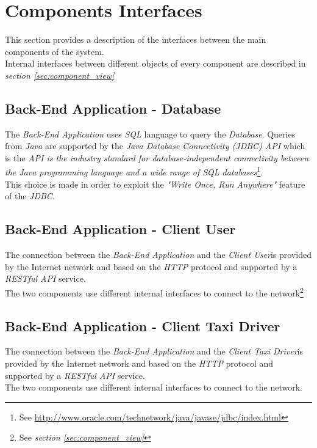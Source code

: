 \section{Components Interfaces} %
\label{sec:components_interfaces}
This section provides a description of the interfaces between the main components of the system.\\
Internal interfaces between different objects of every component are described in \emph{section \ref{sec:component_view}}
\subsection{Back-End Application - Database} %
\label{sub:back_end_application_database}
The \emph{Back-End Application} uses \emph{SQL} language to query the \emph{Database}. Queries from \emph{Java} are supported by the \emph{Java Database Connectivity (JDBC) API} which is the \emph{API is the industry standard for database-independent connectivity between the Java programming language and a wide range of SQL databases}\footnote{See \url{http://www.oracle.com/technetwork/java/javase/jdbc/index.html}}.\\
This choice is made in order to exploit the \emph{"Write Once, Run Anywhere"} feature of the \emph{JDBC}.
\subsection{Back-End Application - Client User} %
\label{sub:back_end_application_client_user}
The connection between the \emph{Back-End Application} and the \emph{Client User}is provided by the Internet network and based on the \emph{HTTP} protocol and supported by a \emph{RESTful API} service.\\
The two components use different internal interfaces to connect to the network\footnote{See \emph{section \ref{sec:component_view}}}
\subsection{Back-End Application - Client Taxi Driver} %
\label{sub:back_end_application_client_user}
The connection between the \emph{Back-End Application} and the \emph{Client Taxi Driver}is provided by the Internet network and based on the \emph{HTTP} protocol and supported by a \emph{RESTful API} service.\\
The two components use different internal interfaces to connect to the network.

